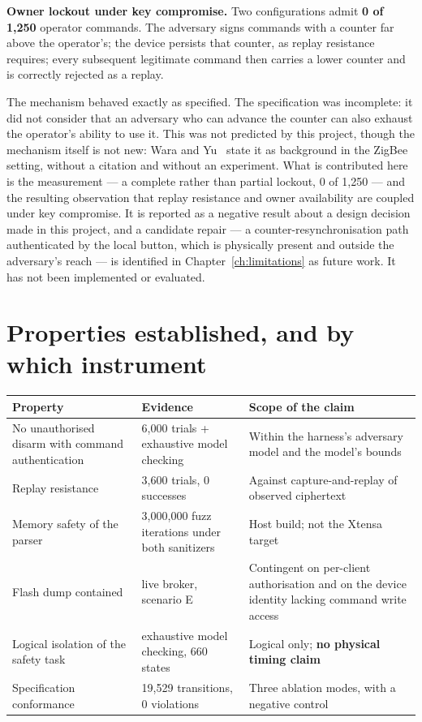 \textbf{Owner lockout under key compromise.} Two configurations admit \textbf{0 of 1,250}
operator commands. The adversary signs commands with a counter far above the operator's; the
device persists that counter, as replay resistance requires; every subsequent legitimate command
then carries a lower counter and is correctly rejected as a replay.

The mechanism behaved exactly as specified. The specification was incomplete: it did not
consider that an adversary who can advance the counter can also exhaust the operator's ability
to use it. This was not predicted by this project, though the mechanism itself is not new: Wara
and Yu~\cite{wara2020} state it as background in the ZigBee setting, without a citation and
without an experiment. What is contributed here is the measurement --- a complete rather than
partial lockout, 0 of 1,250 --- and the resulting observation that replay resistance and owner
availability are coupled under key compromise. It is reported as a negative result about a design
decision made in this project, and a candidate repair --- a counter-resynchronisation path
authenticated by the local button, which is physically present and outside the adversary's reach
--- is identified in Chapter~\ref{ch:limitations} as future work. It has not been implemented or
evaluated.

\section{Properties established, and by which instrument}

\begin{longtable}{@{}p{}p{}p{}@{}}
\toprule
\textbf{Property} & \textbf{Evidence} & \textbf{Scope of the claim} \\
\midrule
\endhead
No unauthorised disarm with command authentication & 6,000 trials + exhaustive model checking
& Within the harness's adversary model and the model's bounds \\
Replay resistance                  & 3,600 trials, 0 successes & Against capture-and-replay of
observed ciphertext \\
Memory safety of the parser        & 3,000,000 fuzz iterations under both sanitizers & Host
build; not the Xtensa target \\
Flash dump contained               & live broker, scenario E & Contingent on per-client
authorisation and on the device identity lacking command write access \\
Logical isolation of the safety task & exhaustive model checking, 660 states & Logical only;
\textbf{no physical timing claim} \\
Specification conformance          & 19,529 transitions, 0 violations & Three ablation modes,
with a negative control \\
\bottomrule
\end{longtable}

